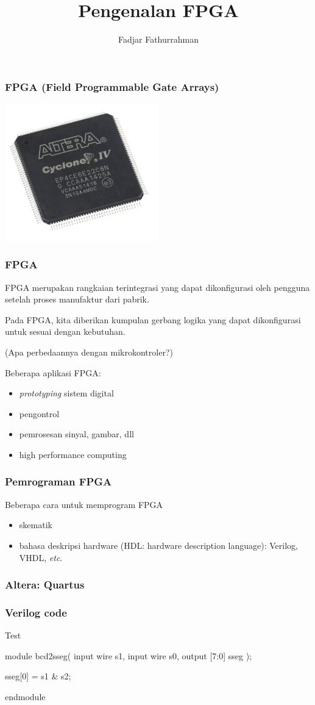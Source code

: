 \documentclass[english]{beamer}
\title{Pengenalan FPGA}
\author{Fadjar Fathurrahman}
\date{}
\begin{document}
\frame{\titlepage}


\begin{frame}
\frametitle{FPGA (Field Programmable Gate Arrays)}

{\centering
\includegraphics[width=0.5\textwidth]{../images/altera_cyclone_iv.jpg}
\par}

\end{frame}


\begin{frame}
\frametitle{FPGA}

FPGA merupakan rangkaian terintegrasi yang dapat dikonfigurasi oleh pengguna
setelah proses manufaktur dari pabrik.

Pada FPGA, kita diberikan kumpulan gerbang logika yang dapat dikonfigurasi
untuk sesuai dengan kebutuhan.

(Apa perbedaannya dengan mikrokontroler?)

Beberapa aplikasi FPGA:
\begin{itemize}
\item \textit{prototyping} sistem digital
\item pengontrol
\item pemrosesan sinyal, gambar, dll
\item high performance computing
\end{itemize}


\end{frame}




\begin{frame}
\frametitle{Pemrograman FPGA}

Beberapa cara untuk memprogram FPGA

\begin{itemize}
\item skematik
\item bahasa deskripsi hardware (HDL: hardware description language): Verilog,
VHDL, \textit{etc}.
\end{itemize}

\end{frame}


\begin{frame}
\frametitle{Altera: Quartus}

\end{frame}


\begin{frame}[fragile]
\frametitle{Verilog code}

Test
\begin{verilogcode}
module bcd2sseg(
  input wire s1,
  input wire s0,
  output [7:0] sseg );
  
  sseg[0] = s1 & s2;

endmodule
\end{verilogcode}



\end{frame}
\end{document}

